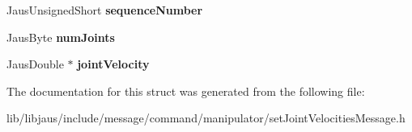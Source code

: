 \begin{DoxyCompactItemize}
\item 
\hypertarget{struct_set_joint_velocities_message_struct_a09b9f30be9958492de676cb0395790a8}{\-Jaus\-Unsigned\-Short {\bfseries sequence\-Number}}\label{struct_set_joint_velocities_message_struct_a09b9f30be9958492de676cb0395790a8}

\item 
\hypertarget{struct_set_joint_velocities_message_struct_ab56f21b332fc7be0ef5328fa186937ef}{\-Jaus\-Byte {\bfseries num\-Joints}}\label{struct_set_joint_velocities_message_struct_ab56f21b332fc7be0ef5328fa186937ef}

\item 
\hypertarget{struct_set_joint_velocities_message_struct_a328eaa490e04bff8edf7712be19f8c8f}{\-Jaus\-Double $\ast$ {\bfseries joint\-Velocity}}\label{struct_set_joint_velocities_message_struct_a328eaa490e04bff8edf7712be19f8c8f}

\end{DoxyCompactItemize}


\-The documentation for this struct was generated from the following file\-:\begin{DoxyCompactItemize}
\item 
lib/libjaus/include/message/command/manipulator/set\-Joint\-Velocities\-Message.\-h\end{DoxyCompactItemize}
